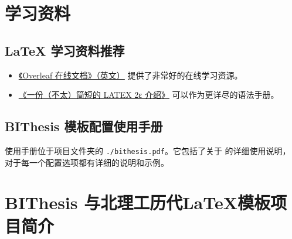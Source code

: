 \begin{appendices}
  \chapter{学习资料}

  \section{LaTeX 学习资料推荐}
  \begin{itemize}[nosep]
    \item \href{https://www.overleaf.com/learn/latex/Tutorials}{《Overleaf 在线文档》（英文）} 提供了非常好的在线学习资源。
    \item \href{https://texdoc.org/serve/lshort-zh-cn.pdf/0}{《一份（不太）简短的 LATEX 2ε 介绍》} 可以作为更详尽的语法手册。
  \end{itemize}

  \section{BIThesis 模板配置使用手册}
  \BIThesis{} 使用手册位于项目文件夹的 \verb|./bithesis.pdf|。它包括了关于 \BIThesis{} 的详细使用说明，
      对于每一个配置选项都有详细的说明和示例。
      
  \chapter{BIThesis 与北理工历代\LaTeX{}模板项目简介}
  

\end{appendices}
